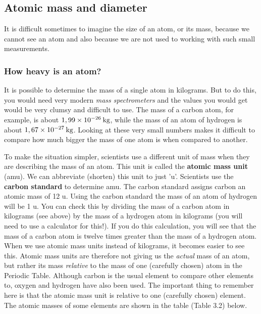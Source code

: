             \subsection{ Atomic mass and diameter}
            \nopagebreak
            \label{m38756*id254850}It is difficult sometimes to imagine the size of an atom, or its mass, because we cannot see an atom and also because we are not used to working with such small measurements.\par 
      \label{m38756*uid7}
            \subsubsection{ How heavy is an atom?}
            \nopagebreak
        \label{m38756*id254863}It is possible to determine the mass of a single atom in kilograms. But to do this, you would need very modern \textsl{mass spectrometers} and the values you would get would be very clumsy and difficult to use. The mass of a carbon atom, for example, is about $1,99\ensuremath{\times}{10}^{-26}\phantom{\rule{2pt}{0ex}}\mathrm{kg}$, while the mass of an atom of hydrogen is about $1,67\ensuremath{\times}{10}^{-27}\phantom{\rule{2pt}{0ex}}\mathrm{kg}$. Looking at these very small numbers makes it difficult to compare how much bigger the mass of one atom is when compared to another.\par 
        \label{m38756*id254908}To make the situation simpler, scientists use a different unit of mass when they are describing the mass of an atom. This unit is called the \textbf{atomic mass unit} (amu). We can abbreviate (shorten) this unit to just 'u'. Scientists use the \textbf{carbon standard} to determine amu. The carbon standard assigns carbon an atomic mass of 12 u. Using the carbon standard the mass of an atom of hydrogen will be 1 u. You can check this by dividing the mass of a carbon atom in kilograms (see above) by the mass of a hydrogen atom in kilograms (you will need to use a calculator for this!). If you do this calculation, you will see that the mass of a carbon atom is twelve times greater than the mass of a hydrogen atom. When we use atomic mass units instead of kilograms, it becomes easier to see this. Atomic mass units are therefore not giving us the \textsl{actual} mass of an atom, but rather its mass \textsl{relative} to the mass of one (carefully chosen) atom in the Periodic Table. Although carbon is the usual element to compare other elements to, oxygen and hydrogen have also been used. The important thing to remember here is that the atomic mass unit is relative to one (carefully chosen) element. The atomic masses of some elements are shown in the  table  (Table 3.2) below.\par 
